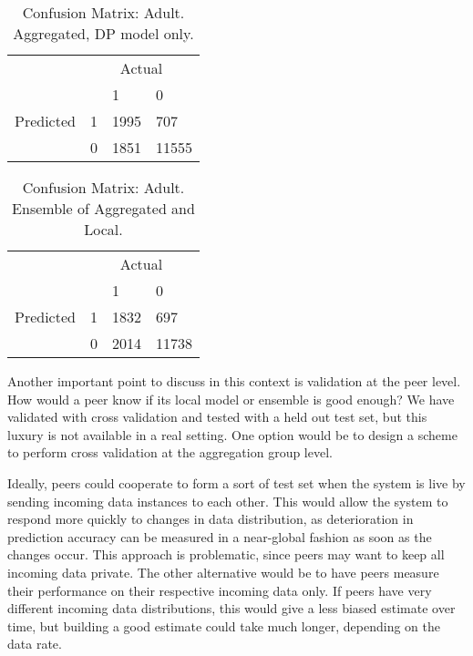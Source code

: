 \begin{table}[h]
	\centering
	\begin{tabular}{llll}
		& \multicolumn{3}{c}{Actual}                                                      \\
		\multicolumn{1}{c}{} &                        & 1                         & 0                          \\ \cline{3-4} 
		Predicted            & \multicolumn{1}{l|}{1} & \multicolumn{1}{l|}{1995} & \multicolumn{1}{l|}{707}   \\ \cline{3-4} 
		& \multicolumn{1}{l|}{0} & \multicolumn{1}{l|}{1851} & \multicolumn{1}{l|}{11555} \\ \cline{3-4} 
	\end{tabular}
		\caption{Confusion Matrix: Adult. Aggregated, DP model only.}
		\label{fig:confmat_adult_aggdp}
\end{table}

\begin{table}[h]
	\centering
	\begin{tabular}{llll}
		& \multicolumn{3}{c}{Actual} \\
		\multicolumn{1}{c}{} &                        & 1                         & 0                          \\ \cline{3-4} 
		Predicted            & \multicolumn{1}{l|}{1} & \multicolumn{1}{l|}{1832} & \multicolumn{1}{l|}{697}   \\ \cline{3-4} 
		& \multicolumn{1}{l|}{0} & \multicolumn{1}{l|}{2014} & \multicolumn{1}{l|}{11738} \\ \cline{3-4} 
	\end{tabular}
		\caption{Confusion Matrix: Adult. Ensemble of Aggregated and Local.}
		\label{fig:confmat_adult_ensemble}
\end{table}

Another important point to discuss in this context is validation at the peer level. How would a peer know if its local model or ensemble is good enough? We have validated with cross validation and tested with a held out test set, but this luxury is not available in a real setting. One option would be to design a scheme to perform cross validation at the aggregation group level.

Ideally, peers could cooperate to form a sort of test set when the system is live by sending incoming data instances to each other. This would allow the system to respond more quickly to changes in data distribution, as deterioration in prediction accuracy can be measured in a near-global fashion as soon as the changes occur. This approach is problematic, since peers may want to keep all incoming data private. The other alternative would be to have peers measure their performance on their respective incoming data only. If peers have very different incoming data distributions, this would give a less biased estimate over time, but building a good estimate could take much longer, depending on the data rate.


